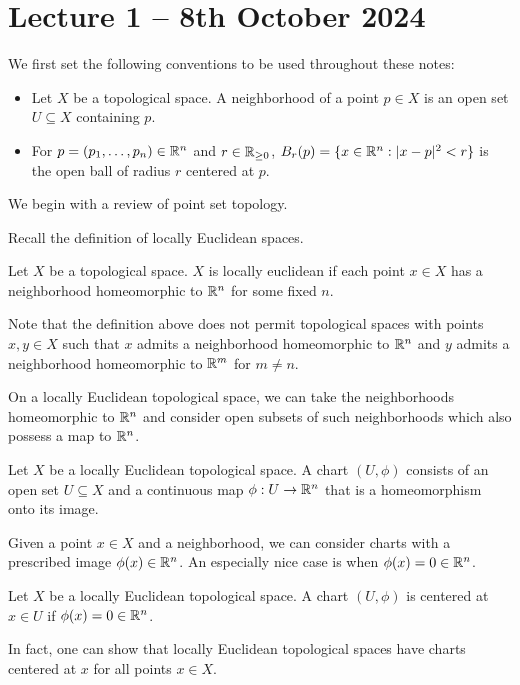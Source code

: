 \section{Lecture 1 -- 8th October 2024}\label{sec: lecture 1}
We first set the following conventions to be used throughout these notes:
\begin{itemize}
    \item Let $X$ be a topological space. A neighborhood of a point $p\in X$ is an open set $U\subseteq X$ containing $p$. 
    \item For $p=(p_{1},\dots,p_{n})\in\mathbb{R}^{n}$ and $r\in\mathbb{R}_{\geq0}$, $B_{r}(p)=\{x\in\mathbb{R}^{n}:|x-p|^{2}<r\}$ is the open ball of radius $r$ centered at $p$. 
\end{itemize}
We begin with a review of point set topology. 

Recall the definition of locally Euclidean spaces. 
\begin{definition}\label{def: locally Euclidean space}
    Let $X$ be a topological space. $X$ is locally euclidean if each point $x\in X$ has a neighborhood homeomorphic to $\mathbb{R}^{n}$ for some fixed $n$. 
\end{definition}
\begin{remark}
    Note that the definition above does not permit topological spaces with points $x,y\in X$ such that $x$ admits a neighborhood homeomorphic to $\mathbb{R}^{n}$ and $y$ admits a neighborhood homeomorphic to $\mathbb{R}^{m}$ for $m\neq n$. 
\end{remark}
On a locally Euclidean topological space, we can take the neighborhoods homeomorphic to $\mathbb{R}^{n}$ and consider open subsets of such neighborhoods which also possess a map to $\mathbb{R}^{n}$. 
\begin{definition}[Chart]\label{def: chart}
    Let $X$ be a locally Euclidean topological space. A chart $(U,\phi)$ consists of an open set $U\subseteq X$ and a continuous map $\phi:U\to\mathbb{R}^{n}$ that is a homeomorphism onto its image. 
\end{definition}
Given a point $x\in X$ and a neighborhood, we can consider charts with a prescribed image $\phi(x)\in\mathbb{R}^{n}$. An especially nice case is when $\phi(x)=0\in\mathbb{R}^{n}$.
\begin{definition}\label{def: centered chart}
    Let $X$ be a locally Euclidean topological space. A chart $(U,\phi)$ is centered at $x\in U$ if $\phi(x)=0\in\mathbb{R}^{n}$. 
\end{definition}
In fact, one can show that locally Euclidean topological spaces have charts centered at $x$ for all points $x\in X$. 
